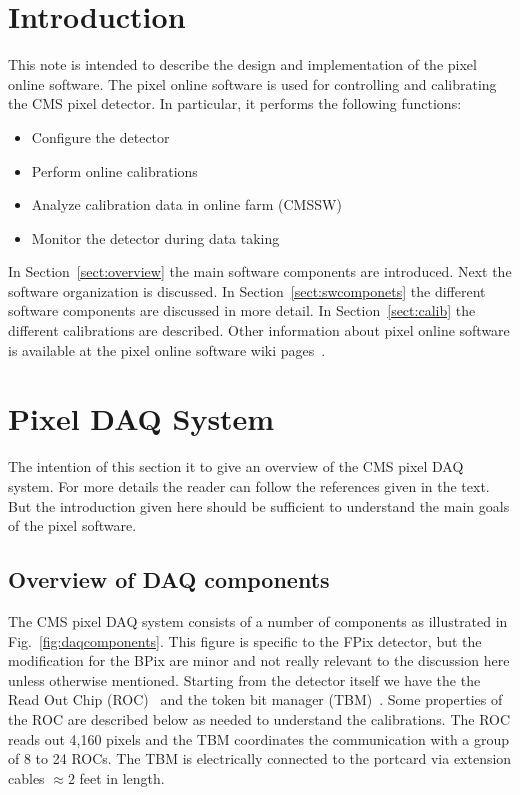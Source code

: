 \section{Introduction}

This note is intended to describe the design and implementation of the
pixel online software. The pixel online software is used for controlling and calibrating the CMS pixel
detector. In particular, it performs the following functions:
\begin{itemize}
\item Configure the detector
\item Perform online calibrations
\item Analyze calibration data in online farm (CMSSW)
\item Monitor the detector during data taking
\end{itemize}

In Section~\ref{sect:overview} the main software components 
are introduced. Next the software organization is discussed.
In Section~\ref{sect:swcomponets} the different software components
are discussed in more detail. In Section~\ref{sect:calib} the
different calibrations are described. Other information about
pixel online software is available at the pixel online
software wiki pages~\cite{poswiki}.

\section{Pixel DAQ System}

The intention of this section it to give an overview of
the CMS pixel DAQ system. For more details the reader
can follow the references given in the text. But the
introduction given here should be sufficient to understand
the main goals of the pixel software.

\subsection{Overview of DAQ components}

The CMS pixel DAQ system consists of a number of 
components as illustrated in Fig.~\ref{fig:daqcomponents}.
This figure is specific to the FPix detector, but the
modification for the BPix are minor and not really 
relevant to the discussion here unless otherwise 
mentioned. Starting from the detector itself we have the the
Read Out Chip (ROC)~\cite{ROC} and the token bit manager 
(TBM)~\cite{TBM}. Some properties of the ROC are described 
below as needed to understand the calibrations. The
ROC reads out 4,160 pixels and the TBM coordinates
the communication with a group of 8 to 24 ROCs.
The TBM is electrically connected to the portcard via
extension cables $\approx 2$ feet in length.

